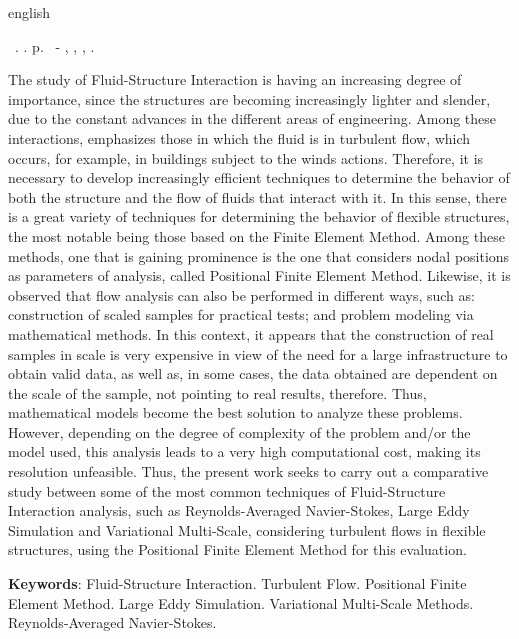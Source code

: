\begin{resumo}[Abstract]
 \begin{otherlanguage*}{english}
    \begin{flushleft}
        \setlength{\absparsep}{0pt} %
        \SingleSpacing
        \Autorabr\ \textbf{\Title}.	\the\year. \pageref{LastPage}p.
        \Typeofwork\ - \Unidademin, \Universidade, \Local, \the\year.
    \end{flushleft}
    \OnehalfSpacing
  
    The study of Fluid-Structure Interaction is having an increasing degree of importance, since the structures are becoming increasingly lighter and slender, due to the constant advances in the different areas of engineering. Among these interactions, emphasizes those in which the fluid is in turbulent flow, which occurs, for example, in buildings subject to the winds actions. Therefore, it is necessary to develop increasingly efficient techniques to determine the behavior of both the structure and the flow of fluids that interact with it. In this sense, there is a great variety of techniques for determining the behavior of flexible structures, the most notable being those based on the Finite Element Method. Among these methods, one that is gaining prominence is the one that considers nodal positions as parameters of analysis, called Positional Finite Element Method. Likewise, it is observed that flow analysis can also be performed in different ways, such as: construction of scaled samples for practical tests; and problem modeling via mathematical methods. In this context, it appears that the construction of real samples in scale is very expensive in view of the need for a large infrastructure to obtain valid data, as well as, in some cases, the data obtained are dependent on the scale of the sample, not pointing to real results, therefore. Thus, mathematical models become the best solution to analyze these problems. However, depending on the degree of complexity of the problem and/or the model used, this analysis leads to a very high computational cost, making its resolution unfeasible. Thus, the present work seeks to carry out a comparative study between some of the most common techniques of Fluid-Structure Interaction analysis, such as Reynolds-Averaged Navier-Stokes, Large Eddy Simulation and Variational Multi-Scale, considering turbulent flows in flexible structures, using the Positional Finite Element Method for this evaluation.
  
    \textbf{Keywords}: Fluid-Structure Interaction. Turbulent Flow. Positional Finite Element Method. Large Eddy Simulation. Variational Multi-Scale Methods. Reynolds-Averaged Navier-Stokes.
\end{otherlanguage*}
\end{resumo}